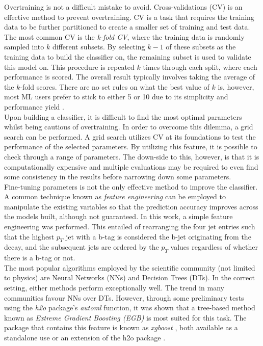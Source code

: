 Overtraining is not a difficult mistake to avoid. Cross-validations (CV) is an effective method to prevent overtraining. CV is a task that requires the training data to be further partitioned to create a smaller set of training and test data. The most common CV is the \textit{k-fold CV}, where the training data is randomly sampled into $k$ different subsets. By selecting $k-1$ of these subsets as the training data to build the classifier on, the remaining subset is used to validate this model on. This procedure is repeated $k$ times through each split, where each performance is scored. The overall result typically involves taking the average of the $k$-fold scores.  There are no set rules on what the best value of $k$ is, however, most ML users prefer to stick to either 5 or 10 due to its simplicity and performance yield \cite{james2013introduction}. \\

Upon building a classifier, it is difficult to find the most optimal parameters whilst being cautious of overtraining. In order to overcome this dilemma, a grid search can be performed. A grid search utilizes CV at its foundations to test the performance of the selected parameters. By utilizing this feature, it is possible to check through a range of parameters. The down-side to this, however, is that it is computationally expensive and multiple evaluations may be required to even find some consistency in the results before narrowing down some parameters. \\

Fine-tuning parameters is not the only effective method to improve the classifier. A common technique known as \textit{feature engineering} can be employed to manipulate the existing variables so that the prediction accuracy improves across the models built, although not guaranteed. In this work, a simple feature engineering was performed. This entailed of rearranging the four jet entries such that the highest $p_T$ jet with a b-tag is considered the b-jet originating from the decay, and the subsequent jets are ordered by the $p_T$ values regardless of whether there is a b-tag or not. \\

The most popular algorithms employed by the scientific community (not limited to physics) are Neural Networks (NNs) and Decision Trees (DTs). In the correct setting, either methods perform exceptionally well. The trend in many communities favour NNs over DTs. However, through some preliminary tests using the \textit{h2o} package's \cite{h2o} \textit{automl} function, it was shown that a tree-based method known as \textit{Extreme Gradient Boosting (EGB)} is most suited for this task. The package that contains this feature is known as \textit{xgboost} , both available as a standalone use \cite{xgboost} or an extension of the h2o package \cite{h2o}. \\

